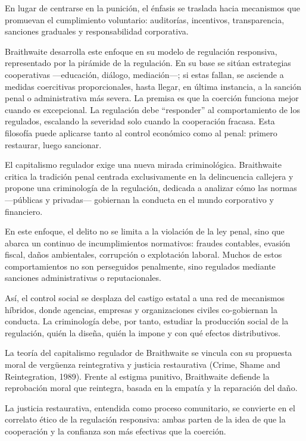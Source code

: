\documentclass[
  spanish,
  letterpaper,
  DIV=11,
  numbers=noendperiod]{scrreprt}
\begin{document}
En lugar de centrarse en la punición, el énfasis se traslada hacia
mecanismos que promuevan el cumplimiento voluntario: auditorías,
incentivos, transparencia, sanciones graduales y responsabilidad
corporativa.

Braithwaite desarrolla este enfoque en su modelo de regulación
responsiva, representado por la pirámide de la regulación. En su base se
sitúan estrategias cooperativas ---educación, diálogo, mediación---; si
estas fallan, se asciende a medidas coercitivas proporcionales, hasta
llegar, en última instancia, a la sanción penal o administrativa más
severa. La premisa es que la coerción funciona mejor cuando es
excepcional. La regulación debe ``responder'' al comportamiento de los
regulados, escalando la severidad solo cuando la cooperación fracasa.
Esta filosofía puede aplicarse tanto al control económico como al penal:
primero restaurar, luego sancionar.

El capitalismo regulador exige una nueva mirada criminológica.
Braithwaite critica la tradición penal centrada exclusivamente en la
delincuencia callejera y propone una criminología de la regulación,
dedicada a analizar cómo las normas ---públicas y privadas--- gobiernan
la conducta en el mundo corporativo y financiero.

En este enfoque, el delito no se limita a la violación de la ley penal,
sino que abarca un continuo de incumplimientos normativos: fraudes
contables, evasión fiscal, daños ambientales, corrupción o explotación
laboral. Muchos de estos comportamientos no son perseguidos penalmente,
sino regulados mediante sanciones administrativas o reputacionales.

Así, el control social se desplaza del castigo estatal a una red de
mecanismos híbridos, donde agencias, empresas y organizaciones civiles
co-gobiernan la conducta. La criminología debe, por tanto, estudiar la
producción social de la regulación, quién la diseña, quién la impone y
con qué efectos distributivos.

La teoría del capitalismo regulador de Braithwaite se vincula con su
propuesta moral de vergüenza reintegrativa y justicia restaurativa
(Crime, Shame and Reintegration, 1989). Frente al estigma punitivo,
Braithwaite defiende la reprobación moral que reintegra, basada en la
empatía y la reparación del daño.

La justicia restaurativa, entendida como proceso comunitario, se
convierte en el correlato ético de la regulación responsiva: ambas
parten de la idea de que la cooperación y la confianza son más efectivas
que la coerción.
\end{document}
